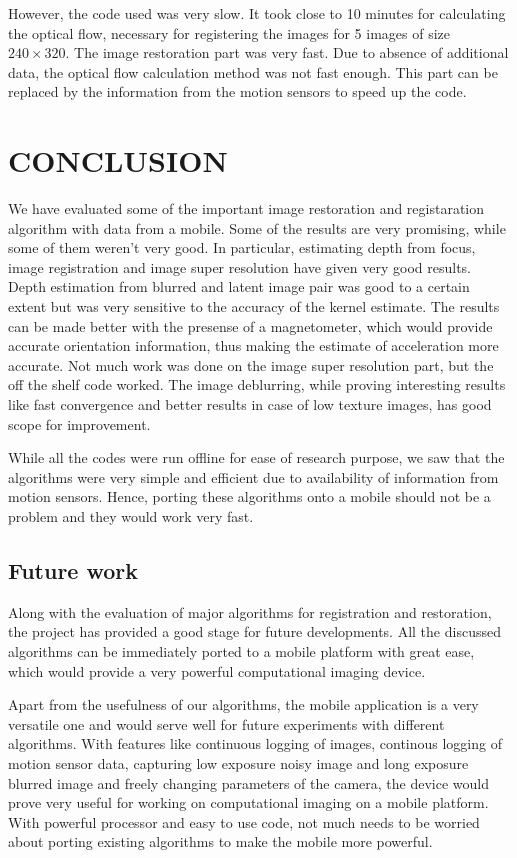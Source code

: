 \documentclass[BTech]{iitmdiss}
\begin{document}
However,
the code used was very slow. It took close to 10 minutes for calculating
the optical flow, necessary for registering the images for 5 images of 
size $240\times320$. The image restoration part was very fast. Due to
absence of additional data, the optical flow calculation method was not
fast enough. This part can be replaced by the information from the motion
sensors to speed up the code. 
\pagebreak

\chapter{CONCLUSION}
\label{chap:conclusion}
We have evaluated some of the important image restoration and registaration
algorithm with data from a mobile. Some of the results are very promising,
while some of them weren't very good. In particular, estimating depth
from focus, image registration and image super resolution have given 
very good results. Depth estimation from blurred and latent image pair
was good to a certain extent but was very sensitive to the accuracy of
the kernel estimate. The results can be made better with the presense
of a magnetometer, which would provide accurate orientation information,
thus making the estimate of acceleration more accurate. Not much work
was done on the image super resolution part, but the off the shelf code
worked. The image deblurring, while proving interesting results like fast
convergence and better results in case of low texture images, has good 
scope for improvement.

While all the codes were run offline for ease of research purpose, we 
saw that the algorithms were very simple and efficient due to availability
of information from motion sensors. Hence, porting these algorithms onto
a mobile should not be a problem and they would work very fast.  

\section{Future work}
Along with the evaluation of major algorithms for registration and 
restoration, the project has provided a good stage for future developments.
All the discussed algorithms can be immediately ported to a mobile 
platform with great ease, which would provide a very powerful 
computational imaging device.

Apart from the usefulness of our algorithms, the mobile application is a
very versatile one and would serve well for future experiments with 
different algorithms. With features like continuous logging of images, 
continous logging of motion sensor data, capturing low exposure noisy 
image and long exposure blurred image and freely changing parameters of 
the camera, the device would prove very useful for working on 
computational imaging on a mobile platform. With powerful processor and
easy to use code, not much needs to be worried about porting existing 
algorithms to make the mobile more powerful.
\end{document}
